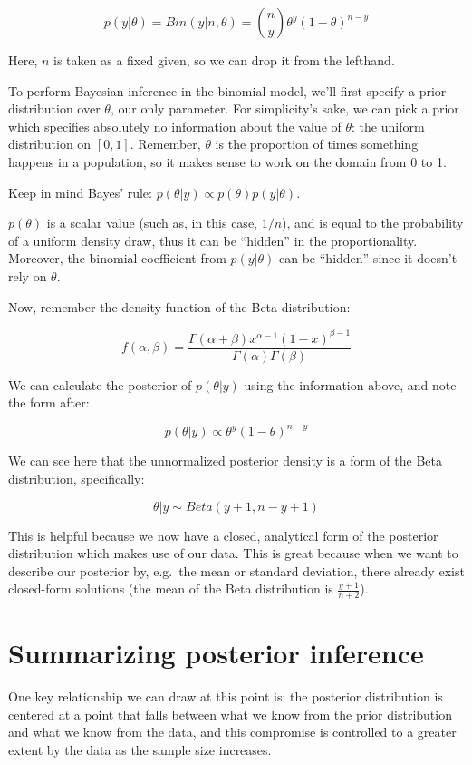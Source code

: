 \documentclass[]{book}
\begin{document}
\[
p(y|\theta) = Bin(y|n,\theta) = {n \choose y} \theta^y (1-\theta)^{n-y}
\]

Here, \(n\) is taken as a fixed given, so we can drop it from the
lefthand.

To perform Bayesian inference in the binomial model, we'll first specify
a prior distribution over \(\theta\), our only parameter. For
simplicity's sake, we can pick a prior which specifies absolutely no
information about the value of \(\theta\): the uniform distribution on
\([0,1]\). Remember, \(\theta\) is the proportion of times something
happens in a population, so it makes sense to work on the domain from 0
to 1.

Keep in mind Bayes' rule: \(p(\theta|y) \propto p(\theta)p(y|\theta)\).

\(p(\theta)\) is a scalar value (such as, in this case, \(1/n\)), and is
equal to the probability of a uniform density draw, thus it can be
``hidden'' in the proportionality. Moreover, the binomial coefficient
from \(p(y|\theta)\) can be ``hidden'' since it doesn't rely on
\(\theta\).

Now, remember the density function of the Beta distribution:

\[
f(\alpha, \beta) = \frac{\Gamma(\alpha + \beta)x^{\alpha-1}(1-x)^{\beta-1}}{\Gamma(\alpha)\Gamma(\beta)}
\]

We can calculate the posterior of \(p(\theta|y)\) using the information
above, and note the form after:

\[
p(\theta|y) \propto \theta^y (1-\theta)^{n-y}
\]

We can see here that the unnormalized posterior density is a form of the
Beta distribution, specifically:

\[
\theta|y \sim Beta(y + 1, n - y + 1)
\]

This is helpful because we now have a closed, analytical form of the
posterior distribution which makes use of our data. This is great
because when we want to describe our posterior by, e.g.~the mean or
standard deviation, there already exist closed-form solutions (the mean
of the Beta distribution is \(\frac{y+1}{n+2}\)).

\section{Summarizing posterior
inference}\label{summarizing-posterior-inference}

One key relationship we can draw at this point is: the posterior
distribution is centered at a point that falls between what we know from
the prior distribution and what we know from the data, and this
compromise is controlled to a greater extent by the data as the sample
size increases.
\end{document}
